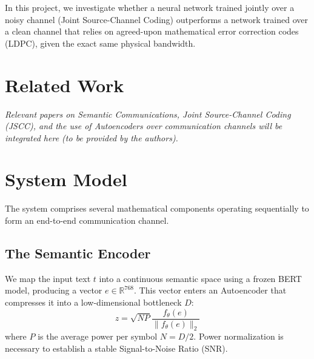\documentclass[a4paper,11pt]{article}
\begin{document}
In this project, we investigate whether a neural network trained jointly over a noisy channel (Joint Source-Channel Coding) outperforms a network trained over a clean channel that relies on agreed-upon mathematical error correction codes (LDPC), given the exact same physical bandwidth.

\section{Related Work}
\textit{Relevant papers on Semantic Communications, Joint Source-Channel Coding (JSCC), and the use of Autoencoders over communication channels will be integrated here (to be provided by the authors).}

\section{System Model}
The system comprises several mathematical components operating sequentially to form an end-to-end communication channel.

\subsection{The Semantic Encoder}
We map the input text $t$ into a continuous semantic space using a frozen BERT model, producing a vector $e \in \mathbb{R}^{768}$. This vector enters an Autoencoder that compresses it into a low-dimensional bottleneck $D$:
\begin{equation}
z = \sqrt{N P} \frac{f_\theta(e)}{\lVert f_\theta(e) \rVert_2}
\end{equation}
where $P$ is the average power per symbol $N = D/2$. Power normalization is necessary to establish a stable Signal-to-Noise Ratio (SNR).
\end{document}
